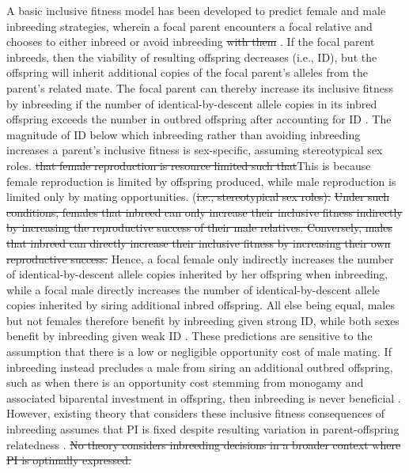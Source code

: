 \documentclass[12pt]{article}
\begin{document}
A basic inclusive fitness model has been developed to predict female and male inbreeding strategies, wherein a focal parent encounters a focal relative and chooses to either inbreed or avoid inbreeding {\color{red}\st{with them}} \cite[][]{Parker1979, Parker2006, Kokko2006, Duthie2015a}. If the focal parent inbreeds, then the viability of resulting offspring decreases (i.e., ID), but the offspring will inherit additional copies of the focal parent's alleles from the parent's related mate. The focal parent can thereby increase its inclusive fitness by inbreeding if the number of identical-by-descent allele copies in its inbred offspring exceeds the number in outbred offspring after accounting for ID \cite[][]{Parker1979, Parker2006, Kokko2006, Szulkin2012, Duthie2015a}. The magnitude of ID below which inbreeding rather than avoiding inbreeding increases a parent's inclusive fitness is sex-specific, assuming {\color{blue}stereotypical sex roles.} {\color{red}\st{that female reproduction is resource limited such that}}{\color{blue}This is because female reproduction is limited by offspring produced}, while male reproduction is limited only by mating opportunities. {\color{red}(\st{i.e., stereotypical sex roles).}} {\color{red}\st{Under such conditions, females that inbreed can only increase their inclusive fitness indirectly by increasing the reproductive success of their male relatives. Conversely, males that inbreed can directly increase their inclusive fitness by increasing their own reproductive success.}} {\color{blue}Hence, a focal female only indirectly increases the number of identical-by-descent allele copies inherited by her offspring when inbreeding, while a focal male directly increases the number of identical-by-descent allele copies inherited by siring additional inbred offspring.} All else being equal, males but not females therefore benefit by inbreeding given strong ID, while both sexes benefit by inbreeding given weak ID \cite[][]{Parker1979, Parker2006, Kokko2006, Duthie2015a}. These predictions are sensitive to the assumption that there is a low or negligible opportunity cost of male mating. If inbreeding instead precludes a male from siring an additional outbred offspring, such as when there is an opportunity cost stemming from monogamy and associated biparental investment in offspring, then inbreeding is never beneficial \cite[][]{Waser1986}. However, existing theory that considers these inclusive fitness consequences of inbreeding assumes that PI is fixed despite resulting variation in parent-offspring relatedness \cite[][]{Trivers1974, Lynch1998, Reid2016}. {\color{red}\st{No theory considers inbreeding decisions in a broader context where PI is optimally expressed.}}
\end{document}
